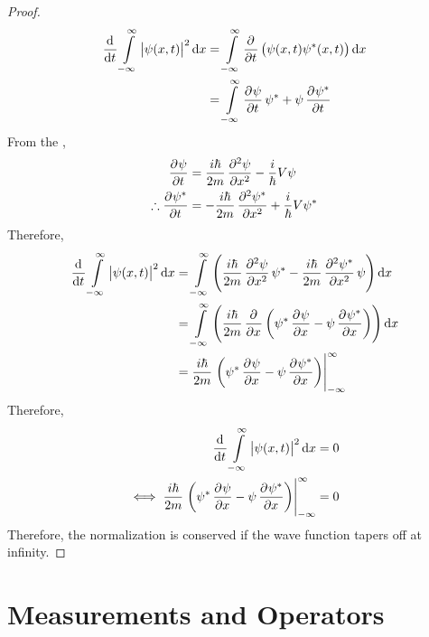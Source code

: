 \documentclass[titlepage, fleqn, a4paper, 12pt, twoside]{article}
\theoremstyle{definition}
\theoremstyle{theorem}
\begin{document}
\begin{proof}
	\begin{align*}
		\dod{}{t} \int\limits_{-\infty}^{\infty} \left| \psi(x,t) \right|^2 \dif x & = \int\limits_{-\infty}^{\infty} \dpd{}{t} \left( \psi(x,t) \psi^*(x,t) \right) \dif x \\
                                                                                           & = \int\limits_{-\infty}^{\infty} \dpd{\psi}{t} \psi^* + \psi \dpd{\psi^*}{t}
	\end{align*}
	From the ,
	\begin{align*}
		\dpd{\psi}{t}              & = \frac{i \hbar}{2 m} \dpd[2]{\psi}{x} - \frac{i}{\hbar} V \psi \\
		\therefore \dpd{\psi^*}{t} & = -\frac{i \hbar}{2 m} \dpd[2]{\psi^*}{x} + \frac{i}{\hbar} V \psi^*
	\end{align*}
	Therefore,
	\begin{align*}
		\dod{}{t} \int\limits_{-\infty}^{\infty} \left| \psi(x,t) \right|^2 \dif x & = \int\limits_{-\infty}^{\infty} \left( \frac{i \hbar}{2 m} \dpd[2]{\psi}{x} \psi^* - \frac{i \hbar}{2 m} \dpd[2]{\psi^*}{x} \psi \right) \dif x \\
                                                                                           & = \int\limits_{-\infty}^{\infty} \left( \frac{i \hbar}{2 m} \dpd{}{x}\left( \psi^* \dpd{\psi}{x} - \psi \dpd{\psi^*}{x} \right) \right) \dif x   \\
                                                                                           & = \frac{i \hbar}{2 m} \left. \left( \psi^* \dpd{\psi}{x} - \psi \dpd{\psi^*}{x} \right) \right|_{-\infty}^{\infty}
	\end{align*}
	Therefore,
	\begin{align*}
		\dod{}{t} \int\limits_{-\infty}^{\infty} \left| \psi(x,t) \right|^2 \dif x                                            & = 0 \\
		\iff \frac{i \hbar}{2 m} \left. \left( \psi^* \dpd{\psi}{x} - \psi \dpd{\psi^*}{x} \right) \right|_{-\infty}^{\infty} & = 0
	\end{align*}
	Therefore, the normalization is conserved if the wave function tapers off at infinity.
\end{proof}

\section{Measurements and Operators}
\end{document}

